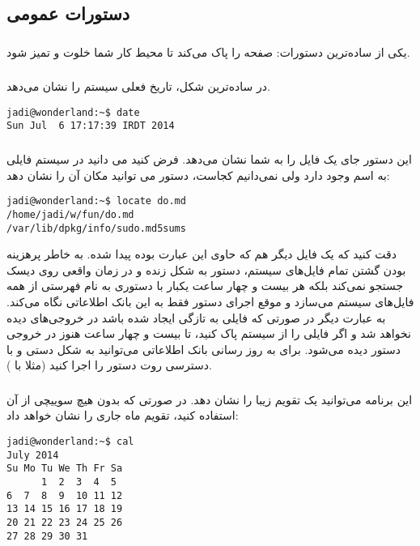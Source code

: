 \subsection*{دستورات عمومی}
\subsubsection*{}
یکی از ساده‌ترین دستورات: صفحه را پاک می‌کند تا محیط کار شما خلوت و تمیز شود.
\subsubsection*{}
در ساده‌ترین شکل، تاریخ فعلی سیستم را نشان می‌دهد.
\begin{frameng}
\begin{lstlisting}
jadi@wonderland:~$ date
Sun Jul  6 17:17:39 IRDT 2014
\end{lstlisting}
\end{frameng}

\subsubsection*{}
این دستور جای یک فایل را به شما نشان می‌دهد. فرض کنید می دانید در سیستم فایلی به اسم 
 وجود دارد ولی نمی‌دانیم کجاست، دستور 
 می توانید مکان آن را نشان دهد:
\begin{frameng}
\begin{lstlisting}
jadi@wonderland:~$ locate do.md
/home/jadi/w/fun/do.md
/var/lib/dpkg/info/sudo.md5sums
\end{lstlisting}
\end{frameng}
دقت کنید که یک فایل دیگر هم که حاوی این عبارت بوده پیدا شده.
به خاطر پرهزینه بودن گشتن تمام فایل‌های سیستم، دستور 
 به شکل زنده و در زمان واقعی روی دیسک جستجو نمی‌کند بلکه هر بیست و چهار ساعت یکبار با دستوری به نام 
 فهرستی از همه فایل‌های سیستم می‌سازد و موقع اجرای دستور 
 فقط به این بانک اطلاعاتی نگاه می‌کند. به عبارت دیگر در صورتی که فایلی به تازگی ایجاد شده باشد در خروجی‌های 
 دیده نخواهد شد و اگر فایلی را از سیستم پاک کنید، تا بیست و چهار ساعت هنوز در خروجی دستور 
 دیده می‌شود. برای به روز رسانی بانک اطلاعاتی می‌توانید به شکل دستی و با دسترسی روت دستور 
 را اجرا کنید (مثلا با
).
\subsubsection*{}
این برنامه می‌توانید یک تقویم زیبا را نشان دهد. در صورتی که بدون هیچ سوییچی از آن استفاده کنید، تقویم ماه جاری را نشان خواهد داد:
\begin{frameng}
\begin{lstlisting}
jadi@wonderland:~$ cal
July 2014        
Su Mo Tu We Th Fr Sa  
      1  2  3  4  5  
6  7  8  9  10 11 12  
13 14 15 16 17 18 19  
20 21 22 23 24 25 26  
27 28 29 30 31     
\end{lstlisting}
\end{frameng}

